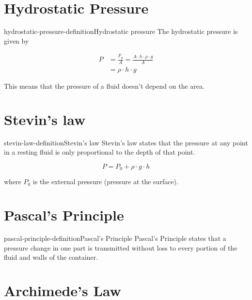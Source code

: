 \documentclass[preview]{standalone}
\begin{document}
\genpage

\section{Hydrostatic Pressure}

\begin{snippetdefinition}{hydrostatic-pressure-definition}{Hydrostatic pressure}
    The hydrostatic pressure is given by
    
    \begin{align*}
        P &= \frac{F_g}{A} = \frac{A \cdot h \cdot \rho \cdot g}{A} \\
        &= \rho \cdot h \cdot g
    \end{align*}
\end{snippetdefinition}

\begin{plainhtml}
    This means that the pressure of a fluid doesn't depend on the area.
\end{plainhtml}

\section{Stevin's law}

\begin{snippetdefinition}{stevin-law-definition}{Stevin's law}
    Stevin's law states that the pressure at any point
    in a resting fluid is only proportional to the depth of that point.

    \[
        P = P_0 + \rho \cdot g \cdot h
    \]

    where \(P_0\) is the external pressure (pressure at the surface).
\end{snippetdefinition}

\section{Pascal's Principle}

\begin{snippetdefinition}{pascal-principle-definition}{Pascal's Principle}
    Pascal's Principle states that a pressure change in one part
is transmitted without loss to every portion of the fluid and walls of the container.
\end{snippetdefinition}

\section{Archimede's Law}
\end{document}
